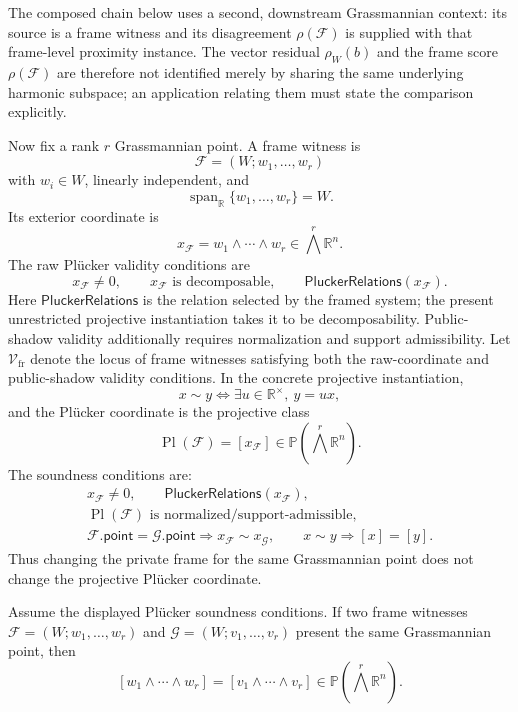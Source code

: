 The composed chain below uses a second, downstream Grassmannian context: its
source is a frame witness and its disagreement \(\rho(\mathcal F)\) is supplied
with that frame-level proximity instance. The vector residual \(\rho_W(b)\) and
the frame score \(\rho(\mathcal F)\) are therefore not identified merely by
sharing the same underlying harmonic subspace; an application relating them
must state the comparison explicitly.

Now fix a rank \(r\) Grassmannian point. A frame witness is
\[
  \mathcal F=(W;w_1,\ldots,w_r)
\]
with \(w_i\in W\), linearly independent, and
\[
  \operatorname{span}_{\mathbb R}\{w_1,\ldots,w_r\}=W.
\]
Its exterior coordinate is
\[
  x_{\mathcal F}=w_1\wedge\cdots\wedge w_r
  \in \bigwedge^r\mathbb R^n.
\]
The raw Pl\"ucker validity conditions are
\[
  x_{\mathcal F}\ne 0,\qquad
  x_{\mathcal F}\text{ is decomposable},\qquad
  \mathsf{PluckerRelations}(x_{\mathcal F}).
\]
Here \(\mathsf{PluckerRelations}\) is the relation selected by the framed
system; the present unrestricted projective instantiation takes it to be
decomposability. Public-shadow validity additionally requires normalization and
support admissibility. Let \(\mathcal V_{\mathrm{fr}}\) denote the locus of
frame witnesses satisfying both the raw-coordinate and public-shadow validity
conditions.
In the concrete projective instantiation,
\[
  x\sim y
  \Longleftrightarrow
  \exists u\in\mathbb R^\times,\ y=u x,
\]
and the Pl\"ucker coordinate is the projective class
\[
  \operatorname{Pl}(\mathcal F)=[x_{\mathcal F}]
  \in \mathbb P\!\left(\bigwedge^r\mathbb R^n\right).
\]
The soundness conditions are:
\[
\begin{gathered}
  x_{\mathcal F}\ne 0,\qquad
  \mathsf{PluckerRelations}(x_{\mathcal F}),\\
  \operatorname{Pl}(\mathcal F)\text{ is normalized/support-admissible},\\
  \mathcal F.\mathsf{point}=\mathcal G.\mathsf{point}
    \Longrightarrow x_{\mathcal F}\sim x_{\mathcal G},\qquad
  x\sim y\Longrightarrow [x]=[y].
\end{gathered}
\]
Thus changing the private frame for the same Grassmannian point does not change
the projective Pl\"ucker coordinate.

\begin{proposition}\label{prop:plucker-invariance}
Assume the displayed Pl\"ucker soundness conditions. If two frame witnesses
\(\mathcal F=(W;w_1,\ldots,w_r)\) and
\(\mathcal G=(W;v_1,\ldots,v_r)\) present the same Grassmannian point, then
\[
  [w_1\wedge\cdots\wedge w_r]
  =
  [v_1\wedge\cdots\wedge v_r]
  \in \mathbb P\!\left(\bigwedge^r\mathbb R^n\right).
\]
\end{proposition}

